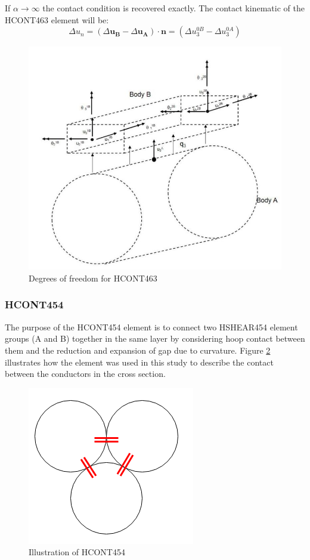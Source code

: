 If $\alpha \rightarrow \infty$ the contact condition is recovered exactly.\newline
\newline 
\noindent The contact kinematic of the HCONT463 element will be:
\begin{equation}
    \Delta u_n= (\Delta \boldsymbol{u_B} - \Delta \boldsymbol{u_A})  \cdot \boldsymbol{n} = (\Delta u_3^{0B} - \Delta u_3^{0A})
\end{equation}
\begin{figure}[H]
\centering
\includegraphics[scale=0.8]{figures/hcont463}
\caption[$\; \:$HCONT463]{Degrees of freedom for HCONT463\cite{Bflextheory2013} }
 \label{fig:HCONT463}
\end{figure}

\subsubsection{HCONT454}
The purpose of the HCONT454 element is to connect two HSHEAR454 element groups (A and B) together in the same layer by considering hoop contact between them and the reduction and expansion of gap due to curvature. Figure \ref{fig:HCONT4541} illustrates how the element was used in this study to describe the contact between the conductors in the cross section.
\begin{figure}[H]
\centering
\includegraphics[scale=0.7]{figures/HCONT4541}
\caption[$\; \:$Illustration of HCONT454]{Illustration of HCONT454}
 \label{fig:HCONT4541}
\end{figure}



